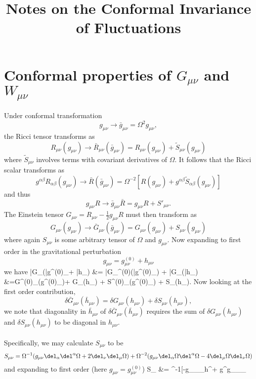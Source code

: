\documentclass[10pt,letterpaper]{article}
\title{Notes on the Conformal Invariance of Fluctuations}
\author{}
\date{}
\begin{document}
\maketitle
\section*{Conformal properties of $G_{\mu\nu}$ and $W_{\mu\nu}$}
\noindent Under conformal transformation
\[
	g_{\mu\nu} \to \bar g_{\mu\nu}=\Omega^2 g_{\mu\nu} ,
\]
the Ricci  tensor  transforms as
\[
	R_{\mu\nu}(g_{\mu\nu})\to \bar R_{\mu\nu}(\bar g_{\mu\nu})= R_{\mu\nu}(g_{\mu\nu}) +\tilde S_{\mu\nu}(g_{\mu\nu}) 
\]
where $\tilde S_{\mu\nu}$ involves terms with covariant derivatives of $\Omega$. It follows that the Ricci scalar transforms as
\[
	g^{\alpha\beta}R_{\alpha\beta}(g_{\mu\nu})\to \bar R(\bar g_{\mu\nu})=\Omega^{-2}[R(g_{\mu\nu})  +g^{\alpha\beta}\tilde S_{\alpha\beta}(g_{\mu\nu})] 
\]
and thus
\[
	g_{\mu\nu}R \to \bar g_{\mu\nu}\bar R= g_{\mu\nu}R + S'_{\mu\nu}.
\]
The Einstein tensor $G_{\mu\nu} = R_{\mu\nu} - \frac12 g_{\mu\nu}R$ must then transform as
\[
	G_{\mu\nu}(g_{\mu\nu}) \to \bar G_{\mu\nu}(\bar g_{\mu\nu}) =G_{\mu\nu}(g_{\mu\nu})+ S_{\mu\nu}(g_{\mu\nu})
\]
where again $S_{\mu\nu}$ is some arbitrary tensor of $\Omega$ and $g_{\mu\nu}$. Now expanding to first order in the gravitational
perturbation
\[
	g_{\mu\nu} = g^{(0)}_{\mu\nu} + h_{\mu\nu}
\]
we have 
\ba
	\bar G_{\mu\nu}(\bar g^{(0)}_{\mu\nu}+ \bar h_{\mu\nu}) &= \bar G_{\mu\nu}^{(0)}(\bar g^{(0)}_{\mu\nu}) + \delta \bar G_{\mu\nu}(\bar h_{\mu\nu})\\
	&=G^{(0)}_{\mu\nu}(g^{(0)}_{\mu\nu})+ \delta G_{\mu\nu}(h_{\mu\nu}) + S^{(0)}_{\mu\nu}(g^{(0)}_{\mu\nu}) + \delta S_{\mu\nu}(h_{\mu\nu}).
\ea
Now looking at the first order contribution,
\[
	 \delta \bar G_{\mu\nu}(\bar h_{\mu\nu}) =  \delta G_{\mu\nu}(h_{\mu\nu}) + \delta S_{\mu\nu}(h_{\mu\nu}),
\]
we note that diagonality in $\bar h_{\mu\nu}$ of  $\delta \bar G_{\mu\nu}(\bar h_{\mu\nu})$ requires the sum of $ \delta G_{\mu\nu}(h_{\mu\nu})$ and $\delta S_{\mu\nu}(h_{\mu\nu})$ to be diagonal in $h_{\mu\nu}$. 
\\ \\
Specifically, we may calculate $S_{\mu\nu}$ to be
\[
	S_{\mu\nu} = \Omega^{-1}( g_{\mu\nu} \del_\alpha \del^\alpha \Omega + 2\del_\nu\del_\mu \Omega) + \Omega^{-2}( g_{\mu\nu}\del_\alpha \Omega \del^\alpha\Omega - 4\del_\mu\Omega \del_\nu\Omega)
\]
and expanding to first order (here $g_{\mu\nu} = g^{(0)}_{\mu\nu}$)
\ba
	\delta S_{\mu\nu} &= \Omega^{-1}[-g_{\mu\nu}\del_\alpha\Omega\del_\beta h^{\alpha\beta}+ g^{\alpha\beta}g_{\mu\nu}\del_\alpha\Omega \del_\beta
\end{document}
